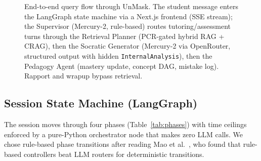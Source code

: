 \documentclass[11pt]{article}
\begin{document}
\begin{figure}[t]
\caption{End-to-end query flow through UnMask. The student message enters the LangGraph state machine via a Next.js frontend (SSE stream); the Supervisor (Mercury-2, rule-based) routes tutoring/assessment turns through the Retrieval Planner (PCR-gated hybrid RAG + CRAG), then the Socratic Generator (Mercury-2 via OpenRouter, structured output with hidden \texttt{InternalAnalysis}), then the Pedagogy Agent (mastery update, concept DAG, mistake log). Rapport and wrapup bypass retrieval.}
\label{fig:architecture}
\end{figure}

\subsection{Session State Machine (LangGraph)}

The session moves through four phases (Table~\ref{tab:phases}) with time ceilings
enforced by a pure-Python orchestrator node that makes zero LLM calls.
We chose rule-based phase transitions after reading Mao et al.\ \cite{diaggpt2023},
who found that rule-based controllers beat LLM routers for deterministic transitions.
\end{document}
